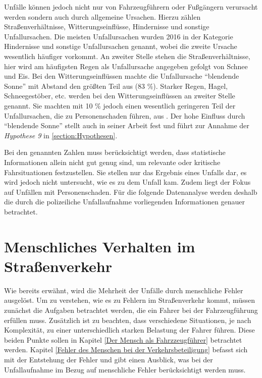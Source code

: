 Unfälle können jedoch nicht nur von Fahrzeugführern oder Fußgängern verursacht werden sondern auch durch allgemeine Ursachen. Hierzu zählen Straßenverhältnisse, Witterungseinflüsse, Hindernisse und sonstige Unfallursachen. Die meisten Unfallursachen wurden 2016 in der Kategorie Hindernisse und sonstige Unfallursachen genannt, wobei die zweite Ursache wesentlich häufiger vorkommt. An zweiter Stelle stehen die Straßenverhältnisse, hier wird am häufigsten Regen als Unfallursache angegeben gefolgt von Schnee und Eis. Bei den Witterungseinflüssen machte die Unfallursache \enquote{blendende Sonne} mit Abstand den größten Teil aus (83 \%). Starker Regen, Hagel, Schneegestöber, etc. werden bei den Witterungseinflüssen an zweiter Stelle genannt. Sie machten mit 10 \% jedoch einen wesentlich geringeren Teil der Unfallursachen, die zu Personenschaden führen, aus \parencite[S. 305]{StatistischesBundesamt.2018b}. Der hohe Einfluss durch \enquote{blendende Sonne} stellt auch \Textcite[S. 151]{Grundl.2005} in seiner Arbeit fest und führt zur Annahme der \textit{Hypothese 9} in \ref{section:Hypothesen}.

Bei den genannten Zahlen muss berücksichtigt werden, dass statistische Informationen allein nicht gut genug sind, um relevante oder kritische Fahrsituationen festzustellen. Sie stellen nur das Ergebnis eines Unfalls dar, es wird jedoch nicht untersucht, wie es zu dem Unfall kam. Zudem liegt der Fokus auf Unfällen mit Personenschaden. Für die folgende Datenanalyse werden deshalb die durch die polizeiliche Unfallaufnahme vorliegenden Informationen genauer betrachtet.

\section{Menschliches Verhalten im Straßenverkehr}
Wie bereits erwähnt, wird die Mehrheit der Unfälle durch menschliche Fehler ausgelöst. Um zu verstehen, wie es zu Fehlern im Straßenverkehr kommt, müssen zunächst die Aufgaben betrachtet werden, die ein Fahrer bei der Fahrzeugführung erfüllen muss. Zusätzlich ist zu beachten, dass verschiedene Situationen, je nach Komplexität, zu einer unterschiedlich starken Belastung der Fahrer führen. Diese beiden Punkte sollen in Kapitel \ref{Der Mensch als Fahrzzeugführer} betrachtet werden. Kapitel \ref{Fehler des Menschen bei der Verkehrsbeteiligung} befasst sich mit der Entstehung der Fehler und gibt einen Ausblick, was bei der Unfallaufnahme im Bezug auf menschliche Fehler berücksichtigt werden muss.


